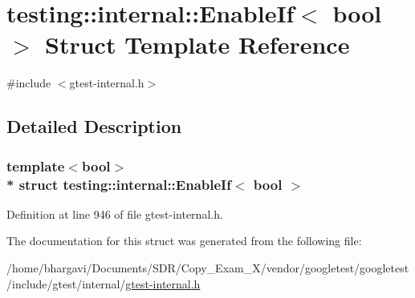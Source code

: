 \hypertarget{structtesting_1_1internal_1_1_enable_if}{}\section{testing\+:\+:internal\+:\+:Enable\+If$<$ bool $>$ Struct Template Reference}
\label{structtesting_1_1internal_1_1_enable_if}


{\ttfamily \#include $<$gtest-\/internal.\+h$>$}



\subsection{Detailed Description}
\subsubsection*{template$<$bool$>$\\*
struct testing\+::internal\+::\+Enable\+If$<$ bool $>$}



Definition at line 946 of file gtest-\/internal.\+h.



The documentation for this struct was generated from the following file\+:\begin{DoxyCompactItemize}
\item 
/home/bhargavi/\+Documents/\+S\+D\+R/\+Copy\+\_\+\+Exam\+\_\+X/vendor/googletest/googletest/include/gtest/internal/\hyperlink{gtest-internal_8h}{gtest-\/internal.\+h}\end{DoxyCompactItemize}
